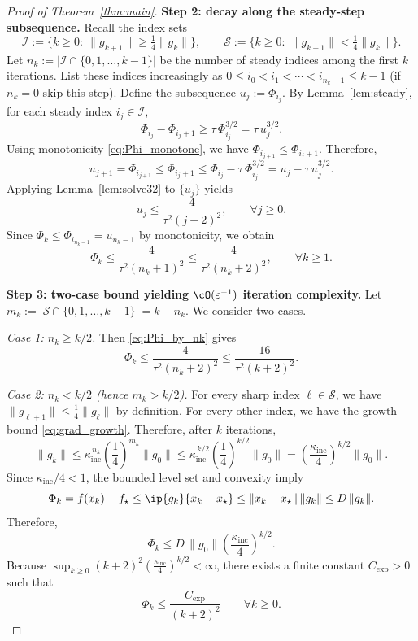 \documentclass[review,onefignum,onetabnum]{siamart171218}
\begin{document}
\begin{proof}[Proof of Theorem~\ref{thm:main}]
\smallskip
\noindent\textbf{Step 2: decay along the steady-step subsequence.}
Recall the index sets
\[
\mathcal I:=\{k\ge 0:\ \|g_{k+1}\|\ge \tfrac14\|g_k\|\},
\qquad
\mathcal S:=\{k\ge 0:\ \|g_{k+1}\|< \tfrac14\|g_k\|\}.
\]
Let $n_k:=|\mathcal I\cap\{0,1,\dots,k-1\}|$ be the number of steady indices among the first $k$ iterations.
List these indices increasingly as $0\le i_0<i_1<\cdots<i_{n_k-1}\le k-1$ (if $n_k=0$ skip this step).
Define the subsequence $u_j:=\Phi_{i_j}$.
By Lemma~\ref{lem:steady}, for each steady index $i_j\in\mathcal I$,
\[
\Phi_{i_j}-\Phi_{i_j+1}\ge \tau\,\Phi_{i_j}^{3/2}=\tau\,u_j^{3/2}.
\]
Using monotonicity \eqref{eq:Phi_monotone}, we have $\Phi_{i_{j+1}}\le \Phi_{i_j+1}$.
Therefore,
\[
u_{j+1}=\Phi_{i_{j+1}}
\le \Phi_{i_j+1}
\le \Phi_{i_j}-\tau\,\Phi_{i_j}^{3/2}
= u_j-\tau\,u_j^{3/2}.
\]
Applying Lemma~\ref{lem:solve32} to $\{u_j\}$ yields
\begin{equation}\label{eq:u_bound}
u_j\le \frac{4}{\tau^2(j+2)^2},\qquad \forall j\ge 0.
\end{equation}
Since $\Phi_k\le \Phi_{i_{n_k-1}}=u_{n_k-1}$ by monotonicity, we obtain
\begin{equation}\label{eq:Phi_by_nk}
\Phi_k\le \frac{4}{\tau^2(n_k+1)^2}\le \frac{4}{\tau^2(n_k+2)^2},
\qquad \forall k\ge 1.
\end{equation}

\smallskip
\noindent\textbf{Step 3: two-case bound yielding $\cO(\varepsilon^{-1})$ iteration complexity.}
Let $m_k:=|\mathcal S\cap\{0,1,\dots,k-1\}|=k-n_k$.
We consider two cases.

\emph{Case 1: $n_k\ge k/2$.}
Then \eqref{eq:Phi_by_nk} gives
\[
\Phi_k\le \frac{4}{\tau^2(n_k+2)^2}\le \frac{16}{\tau^2(k+2)^2}.
\]

\emph{Case 2: $n_k< k/2$ (hence $m_k>k/2$).}
For every sharp index $\ell\in\mathcal S$, we have $\|g_{\ell+1}\|\le \frac14\|g_\ell\|$ by definition.
For every other index, we have the growth bound \eqref{eq:grad_growth}.
Therefore, after $k$ iterations,
\[
\|g_k\|
\le \kappa_{\mathrm{inc}}^{\,n_k}\left(\frac14\right)^{m_k}\|g_0\|
\le \kappa_{\mathrm{inc}}^{\,k/2}\left(\frac14\right)^{k/2}\|g_0\|
=\left(\frac{\kappa_{\mathrm{inc}}}{4}\right)^{k/2}\|g_0\|.
\]
Since $\kappa_{\mathrm{inc}}/4<1$, the bounded level set and convexity imply
\[
\Phi_k=f(\bar x_k)-f_\star
\le \ip{g_k}{\bar x_k-x_\star}
\le \|\bar x_k-x_\star\|\,\|g_k\|
\le D\,\|g_k\|.
\]
Therefore,
\[
\Phi_k\le D\,\|g_0\|\left(\frac{\kappa_{\mathrm{inc}}}{4}\right)^{k/2}.
\]
Because $\sup_{k\ge 0}(k+2)^2\left(\frac{\kappa_{\mathrm{inc}}}{4}\right)^{k/2}<\infty$, there exists a finite constant $C_{\exp}>0$ such that
\[
\Phi_k\le \frac{C_{\exp}}{(k+2)^2}\qquad\forall k\ge 0.
\]


\end{proof}
\end{document}
